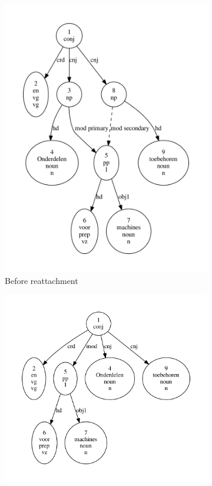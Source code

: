 \begin{figure}[t]
    \begin{subfigure}[t]{0.49\textwidth}
        \centering
        \includegraphics[scale=0.46]{Figures/cnj_mod1.pdf}
        \caption{Before reattachment}
    \end{subfigure}
    \begin{subfigure}[t]{0.49\textwidth}
        \centering
        \includegraphics[scale=0.46]{Figures/cnj_mod2.pdf}

\end{subfigure}
\end{figure}
